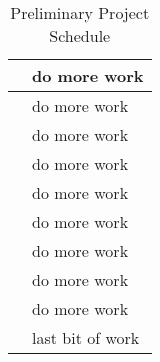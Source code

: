 \begin{table}[ht]
\begin{tabularx}{\linewidth}{
    |>{\hsize=0.5\hsize}X|%
    >{\hsize=1.5\hsize}X|%
}
	\rowcolor{mymagenta2}{August 2016} & {do more work} \\ \hline
	\rowcolor{mymagenta3}{September 2016} & {do more work} \\ \hline
	\rowcolor{mymagenta4}{October 2016}   & {do more work} \\ \hline
	\rowcolor{mymagenta5}{November 2016}  & {do more work} \\ \hline
	\rowcolor{mymagenta6}{December 2016}  & {do more work} \\ \hline
	\rowcolor{mymagenta7}{January 2017}   & {do more work} \\ \hline
	\rowcolor{mymagenta8}{February 2017}  & {do more work} \\ \hline
	\rowcolor{mymagenta9}{March 2017}     & {do more work} \\ \hline
	\rowcolor{mymagenta10}{April 2017}     & {do more work} \\ \hline
	\rowcolor{mymagenta1}{May 2017}       & {last bit of work} \\ \hline 
\end{tabularx}
\caption{Preliminary Project Schedule}
\label{sec:schedule:preliminary-schedule}
\end{table}

